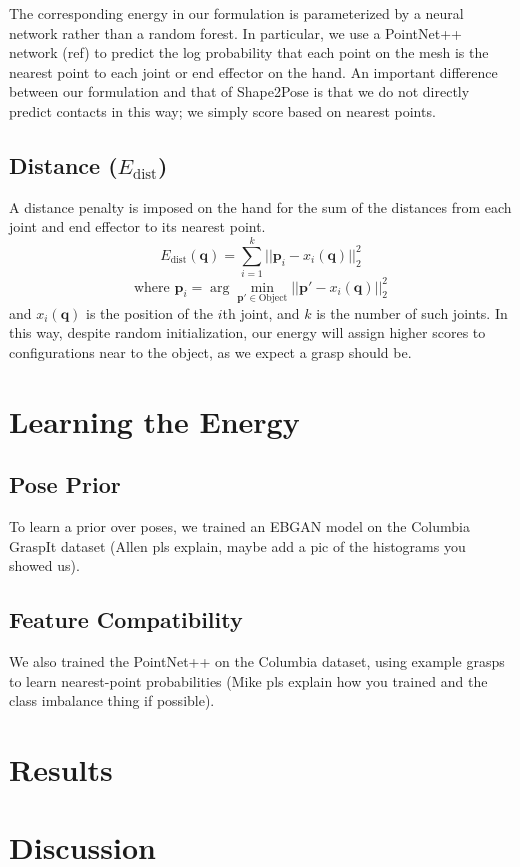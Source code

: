 \documentclass[10pt,twocolumn,letterpaper]{article}
\def\q{\mathbf{q}}
\def\p{\mathbf{p}}
\begin{document}
The corresponding energy in our formulation is parameterized by a neural network rather than a random forest. In particular, we use a PointNet++ network (ref) to predict the log probability that each point on the mesh is the nearest point to each joint or end effector on the hand. An important difference between our formulation and that of Shape2Pose is that we do not directly predict contacts in this way; we simply score based on nearest points.

\subsection{Distance ($E_{\text{dist}}$)}
A distance penalty is imposed on the hand for the sum of the distances from each joint and end effector to its nearest point.
\begin{equation}
E_{\text{dist}}(\q) = \sum_{i=1}^k ||\p_i - x_i(\q)||^2_2
\end{equation}
\begin{equation}
\text{where } \p_i = \arg \min_{\p' \in \text{Object}} ||\p' - x_i(\q)||^2_2
\end{equation}
and $x_i(\q)$ is the position of the $i$th joint, and $k$ is the number of such joints.
In this way, despite random initialization, our energy will assign higher scores to configurations near to the object, as we expect a grasp should be.


\section{Learning the Energy}
\subsection{Pose Prior}
To learn a prior over poses, we trained an EBGAN model on the Columbia GraspIt dataset (Allen pls explain, maybe add a pic of the histograms you showed us).
\subsection{Feature Compatibility}
We also trained the PointNet++ on the Columbia dataset, using example grasps to learn nearest-point probabilities (Mike pls explain how you trained and the class imbalance thing if possible).

\section{Results}

\section{Discussion}


{\small


}
\end{document}
